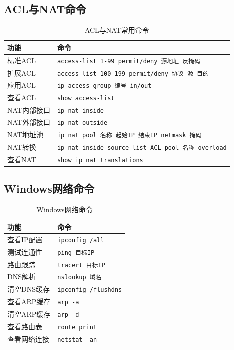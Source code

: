 \documentclass[12pt,a4paper]{ctexart}
\begin{document}
\subsection{ACL与NAT命令}

\begin{table}[htbp]
\centering\small
\begin{tabular}{ll}
\toprule
\textbf{功能} & \textbf{命令} \\
\midrule
标准ACL & \texttt{access-list 1-99 permit/deny 源地址 反掩码} \\
扩展ACL & \texttt{access-list 100-199 permit/deny 协议 源 目的} \\
应用ACL & \texttt{ip access-group 编号 in/out} \\
查看ACL & \texttt{show access-list} \\
NAT内部接口 & \texttt{ip nat inside} \\
NAT外部接口 & \texttt{ip nat outside} \\
NAT地址池 & \texttt{ip nat pool 名称 起始IP 结束IP netmask 掩码} \\
NAT转换 & \texttt{ip nat inside source list ACL pool 名称 overload} \\
查看NAT & \texttt{show ip nat translations} \\
\bottomrule
\end{tabular}
\caption{ACL与NAT常用命令}
\end{table}

\subsection{Windows网络命令}

\begin{table}[htbp]
\centering\small
\begin{tabular}{ll}
\toprule
\textbf{功能} & \textbf{命令} \\
\midrule
查看IP配置 & \texttt{ipconfig /all} \\
测试连通性 & \texttt{ping 目标IP} \\
路由跟踪 & \texttt{tracert 目标IP} \\
DNS解析 & \texttt{nslookup 域名} \\
清空DNS缓存 & \texttt{ipconfig /flushdns} \\
查看ARP缓存 & \texttt{arp -a} \\
清空ARP缓存 & \texttt{arp -d} \\
查看路由表 & \texttt{route print} \\
查看网络连接 & \texttt{netstat -an} \\
\bottomrule
\end{tabular}
\caption{Windows网络命令}
\end{table}
\end{document}
